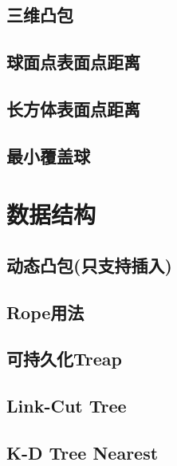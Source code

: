 \documentclass[10pt, a4paper]{article}
\begin{document}
  \subsection{三维凸包}
    

  \subsection{球面点表面点距离}
    
    
  \subsection{长方体表面点距离}
    

  \subsection{最小覆盖球}
    

\section{数据结构}
  \subsection{动态凸包(只支持插入)}
    
    
  \subsection{Rope用法}
    
  
  \subsection{可持久化Treap}
    
  
  \subsection{Link-Cut Tree}
    

  \subsection{K-D Tree Nearest}
    
\end{document}
